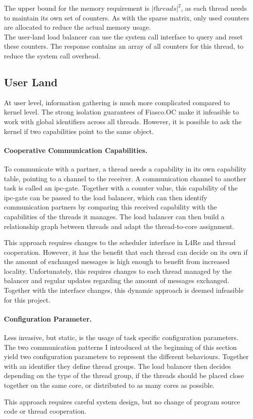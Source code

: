 The upper bound for the memory requirement is $|\textit{threads}|^2$, as each thread
needs to maintain its own set of counters.
As with the sparse matrix, only used counters are allocated to reduce the
actual memory usage.
\\

The user-land load balancer can use the system call interface to query
and reset these counters.
The response contains an array of all counters for this thread, to reduce the
system call overhead.


\subsection{User Land}
At user level, information gathering is much more complicated compared to
kernel level.
The strong isolation guarantees of Fiasco.OC make it infeasible to work with global
identifiers across all threads.
However, it is possible to ask the kernel if two capabilities point to the
same object.

\paragraph{Cooperative Communication Capabilities.}
To communicate with a partner, a thread needs a capability in its own
capability table, pointing to a channel to the receiver.
A communication channel to another task is called an \gls{ipc}-gate.
Together with a counter value, this capability of the \gls{ipc}-gate can be
passed to the load balancer, which can then identify communication partners by
comparing this received capability with the capabilities of the threads
it manages.
The load balancer can then build a relationship graph between threads and adapt
the thread-to-core assignment.

This approach requires changes to the scheduler interface in L4Re and
thread cooperation.
However, it has the benefit that each thread can decide on its own if the
amount of exchanged messages is high enough to benefit from increased
locality.
Unfortunately, this requires changes to each thread managed by the balancer and
regular updates regarding the amount of messages exchanged.
Together with the interface changes, this dynamic approach is deemed infeasible
for this project.

\paragraph{Configuration Parameter.}
Less invasive, but static, is the usage of task specific configuration parameters.
The two communication patterns I introduced at the beginning of this section
yield two configuration parameters to represent the different behaviours.
Together with an identifier they define thread groups.
The load balancer then decides depending on the type of the thread group, if
the threads should be placed close together on the same core, or distributed to
as many cores as possible.

This approach requires careful system design, but no change of program source
code or thread cooperation.
